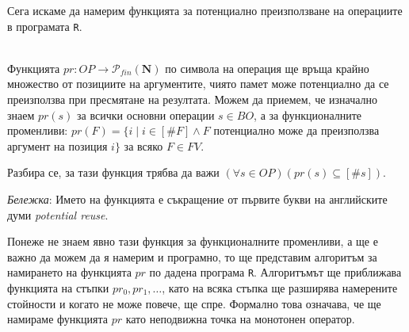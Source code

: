 \documentclass[12pt,twoside,a4paper]{article}
\begin{document}
	Сега искаме да намерим функцията за потенциално преизползване на операциите в програмата \texttt{R}.
	
	\begin{definition}[функцията $pr$]\label{def:pr}~\\
		\indent Функцията $pr \colon OP \to \mathcal{P}_{fin}(\mathbf{N})$ по символа на операция ще връща крайно множество от позициите на аргументите, чиято памет може потенциално да се преизползва при пресмятане на резултата. Можем да приемем, че изначално знаем $pr(s)$ за всички основни операции $s \in BO$, а за функционалните променливи: $pr(F) = \{ i \mid i \in [\#F] \land F$ потенциално може да преизползва аргумент на позиция $i\}$ за всяко $F \in FV$.
		
		Разбира се, за тази функция трябва да важи $(\forall s \in OP)(pr(s) \subseteq [\#s])$.
		
		\textit{Бележка}: Името на функцията е съкращение от първите букви на английските думи \textit{potential reuse}.
	\end{definition}
	
	Понеже не знаем явно тази функция за функционалните променливи, а ще е важно да можем да я намерим и програмно, то ще представим алгоритъм за намирането на функцията $pr$ по дадена програма \texttt{R}. Алгоритъмът ще приближава функцията на стъпки $pr_0, pr_1, \dots$, като на всяка стъпка ще разширява намерените стойности и когато не може повече, ще спре. Формално това означава, че ще намираме функцията $pr$ като неподвижна точка на монотонен оператор.
	
\end{document}

